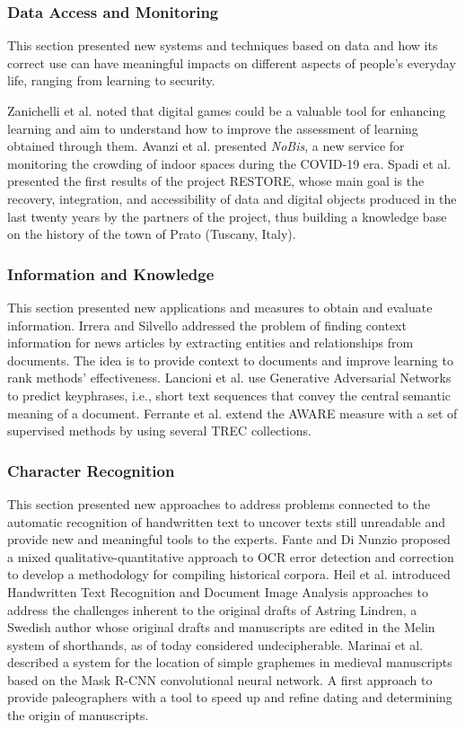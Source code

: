 \documentclass{sig-alternate-10pt}
\begin{document}
\subsubsection*{Data Access and Monitoring}
This section presented new systems and techniques based on data and how its correct use can have meaningful impacts on different aspects of people's everyday life, ranging from learning to security.

Zanichelli et al. \cite{ZanichelliETTC21} noted that digital games could be a valuable tool for enhancing learning and aim to understand how to improve the assessment of learning obtained through them.
Avanzi et al. \cite{AvanziCCG021} presented \emph{NoBis}, a new service for monitoring the crowding of indoor spaces during the COVID-19 era.
Spadi et al. \cite{SpadiSD21} presented the first results of the project RESTORE, whose main goal is the recovery, integration, and accessibility of data and digital objects produced in the last twenty years by the partners of the project, thus building a knowledge base on the history of the town of Prato (Tuscany, Italy).


\subsubsection*{Information and Knowledge}
This section presented new applications and measures to obtain and evaluate information. 
Irrera and Silvello \cite{IrreraS21} addressed the problem of finding context information for news articles by extracting entities and relationships from documents. The idea is to provide context to documents and improve learning to rank methods' effectiveness.
Lancioni et al. \cite{LancioniMP0T21} use Generative Adversarial Networks to predict keyphrases, i.e., short text sequences that convey the central semantic meaning of a document. 
Ferrante et al. \cite{Ferrante0P21} extend the AWARE measure with a set of supervised methods by using several TREC collections. 

\subsubsection*{Character Recognition}
This section presented new approaches to address problems connected to the automatic recognition of handwritten text to uncover texts still unreadable and provide new and meaningful tools to the experts.
Fante and Di Nunzio \cite{FanteN21} proposed a mixed qualitative-quantitative approach to OCR error detection and correction to develop a methodology for compiling historical corpora. 
Heil et al. \cite{HeilNH21} introduced Handwritten Text Recognition and Document Image Analysis approaches to address the challenges inherent to the original drafts of Astring Lindren, a Swedish author whose original drafts and manuscripts are edited in the Melin system of shorthands, as of today considered undecipherable.
Marinai et al. \cite{MarinaiPRS21} described a system for the location of simple graphemes in medieval manuscripts based on the Mask R-CNN convolutional neural network. A first approach to provide paleographers with a tool to speed up and refine dating and determining the origin of manuscripts.
\end{document}

